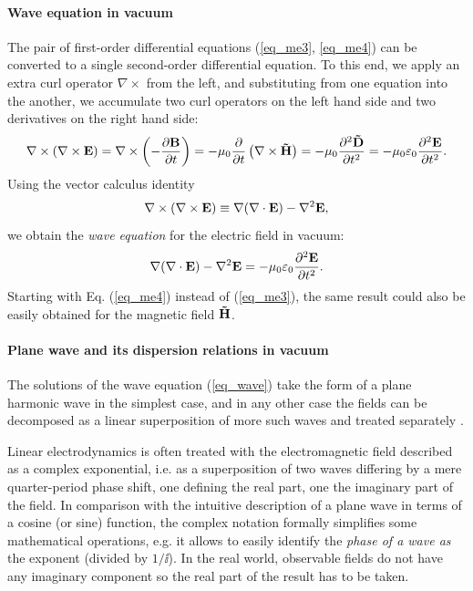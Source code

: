 \paragraph{Wave equation in vacuum} The pair of first-order differential equations (\ref{eq_me3}, \ref{eq_me4}) can be converted to a single second-order differential equation. To this end, we apply an extra curl operator $\nabla\times$ from the left, and substituting from one equation into the another, we accumulate two curl operators on the left hand side and two derivatives on the right hand side: %
\begin{equation} \nabla\times (\nabla\times \mathbf{E}) = \nabla\times \left(- \frac{\partial \mathbf{B}} {\partial t}\right) = -\mu_0 \frac{\partial}{\partial t} \left(\nabla\times \mathbf{\tilde{H}}\right) 
= -\mu_0 \frac{\partial^{2} \mathbf{\tilde{D}}}{\partial t^{2}} = -\mu_0 \varepsilon_0 \frac{\partial^{2} \mathbf{E}}{\partial t^{2}}.  \label{eq_elim}\end{equation}
Using the vector calculus identity
\begin{equation} \nabla\times (\nabla\times \mathbf{E}) \equiv \nabla (\nabla \cdot \mathbf{E}) - \nabla^2 \mathbf{E}, \label{eq_rotrot}\end{equation}
we obtain the \textit{wave equation} for the electric field in vacuum: 
\begin{equation}  \nabla (\nabla \cdot \mathbf{E}) - \nabla^2 \mathbf{E} = -\mu_0 \varepsilon_0 \frac{\partial^{2} \mathbf{E}}{\partial t^{2}}.  \label{eq_wave}\end{equation}
Starting with Eq. (\ref{eq_me4}) instead of (\ref{eq_me3}), the same result could also be easily obtained for the magnetic field $\mathbf{\tilde{H}}$.
\paragraph{Plane wave and its dispersion relations in vacuum} %
The solutions of the wave equation (\ref{eq_wave}) take the form of a plane harmonic wave in the simplest case, and in any other case the fields can be decomposed as a linear superposition of more such waves and treated separately \cite{jackson1962book}. 

Linear electrodynamics is often treated with the electromagnetic field described as a complex exponential, i.e. as a superposition of two waves differing by a mere quarter-period phase shift, one defining the real part, one the imaginary part of the field. In comparison with the intuitive description of a plane wave in terms of a cosine (or sine) function, the complex notation formally simplifies some mathematical operations, e.g. it allows to easily identify the \textit{phase of a wave as} the exponent (divided by $1/\ii$). In the real world, observable fields do not have any imaginary component so the real part of the result has to be taken. 


